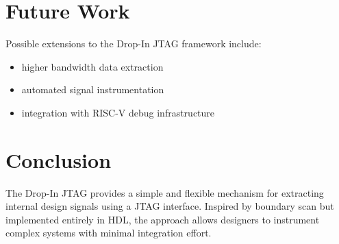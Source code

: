 \documentclass[10pt]{article}
\begin{document}
\section{Future Work}

Possible extensions to the Drop-In JTAG framework include:

\begin{itemize}
\item higher bandwidth data extraction
\item automated signal instrumentation
\item integration with RISC-V debug infrastructure
\end{itemize}

\section{Conclusion}

The Drop-In JTAG provides a simple and flexible mechanism for extracting internal design signals using a JTAG interface. Inspired by boundary scan but implemented entirely in HDL, the approach allows designers to instrument complex systems with minimal integration effort.



\end{document}
